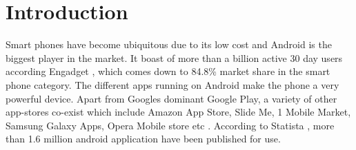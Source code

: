 \section{Introduction}
\label{intro}
Smart phones have become ubiquitous due to its low cost and Android is the biggest player in the market. It boast of more than a billion active 30 day users according Engadget \citep{Engadget_market_share}, which comes down to 84.8\% market share in the smart phone category. The different apps running on Android make the phone a very powerful device. Apart from Googles dominant Google Play, a variety of other app-stores co-exist which include Amazon App Store, Slide Me, 1 Mobile Market, Samsung Galaxy Apps, Opera Mobile store etc \citep{Online_App_Stores}. According to Statista \citep{Android_app_number}, more than 1.6 million android application have been published for use. 

